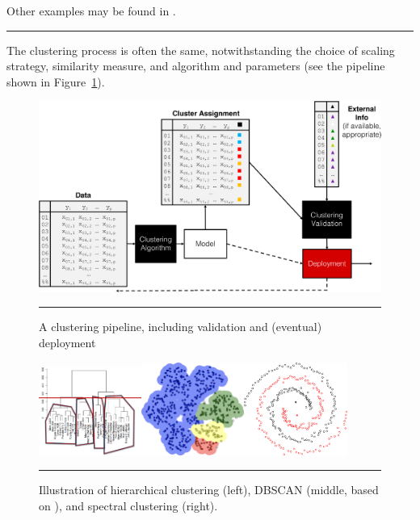 Other examples may be found in \cite{DSML_CL1,DSML_CL5,DSML_CL6,DSML_CL7,DSML_CL8,DSML_CL9,DSML_CL10,DSML_CL101,DSML_CL11,DSML_CL12,DSML_CL13,DSML_CL14,DSML_CL15}. 
\begin{center}
    \rule{0.5\textwidth}{.4pt}
\end{center} 
The clustering process is often the same, notwithstanding the choice of scaling strategy, similarity measure, and algorithm and parameters (see the pipeline shown in Figure~\ref{fig:clust4}). 
\begin{figure}[!t]
\centering
\includegraphics[width=\textwidth]{images/DSML/Clustering_Pipeline.png}
\caption[\small Clustering pipeline]{\small A clustering pipeline, including validation and (eventual) deployment}\hrule\label{fig:clust4}
\end{figure}
\afterpage{\FloatBarrier}
\begin{figure}[H]
\centering
\includegraphics[width=0.3\textwidth]{images/DSML/cluster_dendrogram.png}\quad \includegraphics[width=0.3\textwidth]{images/DSML/dbscan.png}\quad \includegraphics[width=0.3\textwidth]{images/DSML/spectral.png}
\caption[\small Illustration of hierarchical clustering, DBSCAN, and spectral clustering]{\small Illustration of hierarchical clustering (left), DBSCAN (middle, based on \cite{DSML_CL20}), and spectral clustering (right).}\hrule\label{fig:clustden}
\end{figure}
\afterpage{\FloatBarrier}
